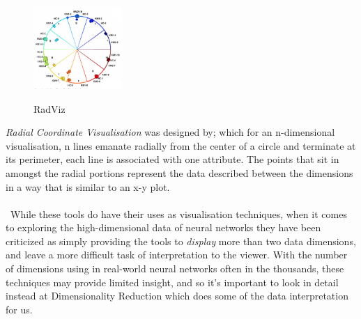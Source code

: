 \documentclass[a4paper,11pt,titlepage]{article}
\begin{document}
	\begin{figure}[H]
    			\centering	
			{{\includegraphics[width=0.3\textwidth]
    				{img/battista_vertices} 
    			}}%
    			\caption{RadViz}%
    		\label{fig:lascaux}
	\end{figure}	 		
 		
 		
		\textit{Radial Coordinate Visualisation} was designed by\cite{Hoffman1999}; which for an n-dimensional visualisation, n lines emanate radially from the center of a circle and terminate at its perimeter, each line is associated with one attribute. The points that sit in amongst the radial portions represent the data described between the dimensions in a way that is similar to an x-y plot.
		\\\
		\\\
	While these tools do have their uses as visualisation techniques, when it comes to exploring the high-dimensional data of neural networks they have been criticized \cite{Maaten2008} as simply providing the tools to \textit{display} more than two data dimensions, and leave a more difficult task of interpretation to the viewer. With the number of dimensions using in real-world neural networks often in the thousands, these techniques may provide limited insight, and so it's important to look in detail instead at Dimensionality Reduction which does some of the data interpretation for us.
\\\
\end{document}
